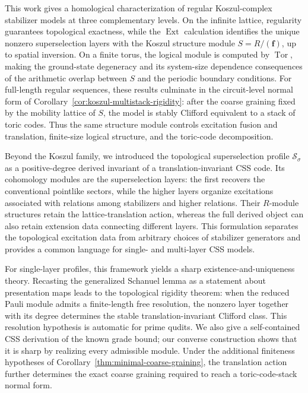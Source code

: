 \documentclass[aps,prx,english,superscriptaddress,twocolumn,tightenlines,showpacs,longbibliography,floatfix,amsfonts]{revtex4-2}
\theoremstyle{remark}
\theoremstyle{definition}
\begin{document}
This work gives a homological characterization of regular Koszul-complex
stabilizer models at three complementary levels.  On the infinite lattice,
regularity guarantees topological exactness, while the \(\operatorname{Ext}\)
calculation identifies the unique nonzero superselection layers with the
Koszul structure module \(S=R/(\mathbf f)\), up to spatial inversion.  On a
finite torus, the logical module is computed by \(\operatorname{Tor}\), making
the ground-state degeneracy and its system-size dependence consequences of
the arithmetic overlap between \(S\) and the periodic boundary conditions.
For full-length regular sequences, these results culminate in the
circuit-level normal form of
Corollary~\ref{cor:koszul-multistack-rigidity}: after the coarse graining fixed
by the mobility lattice of \(S\), the model is stably Clifford equivalent to a
stack of toric codes.  Thus the same structure module controls excitation
fusion and translation, finite-size logical structure, and the toric-code
decomposition.

Beyond the Koszul family, we introduced the topological superselection profile
\(\mathscr S_\sigma\) as a positive-degree derived invariant of a
translation-invariant CSS code.  Its cohomology modules are the
superselection layers: the first recovers the conventional pointlike sectors,
while the higher layers organize excitations associated with relations among
stabilizers and higher relations.  Their \(R\)-module structures retain the
lattice-translation action, whereas the full derived object can also retain
extension data connecting different layers.  This formulation separates the
topological excitation data from arbitrary choices of stabilizer generators
and provides a common language for single- and multi-layer CSS models.

For single-layer profiles, this framework yields a sharp
existence-and-uniqueness theory.  Recasting the generalized Schanuel lemma as a
statement about presentation maps leads to the topological rigidity theorem:
when the reduced Pauli module admits a finite-length free resolution, the
nonzero layer together with its degree determines the stable
translation-invariant Clifford class.  This resolution hypothesis is
automatic for prime qudits.  We also give a self-contained CSS derivation of
the known grade bound; our converse construction shows that it is sharp by
realizing every admissible module.  Under the additional finiteness
hypotheses of Corollary~\ref{thm:minimal-coarse-graining}, the translation
action further determines the exact coarse graining required to reach a
toric-code-stack normal form.
\end{document}
